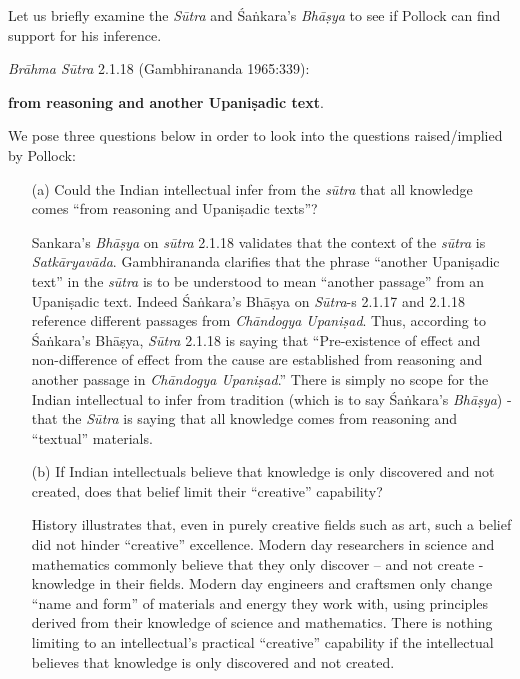 Let us briefly examine the {\sl Sūtra} and Śaṅkara's {\sl Bhāṣya} to see if Pollock can find support for his inference.

{\sl Brāhma Sūtra} 2.1.18 (Gambhirananda 1965:339):
\begin{myquote}
 \textbf{from reasoning and another Upaniṣadic text}.
\end{myquote}

We pose three questions below in order to look into the questions raised/implied by Pollock:
\begin{itemize}
\item[(a)] Could the Indian intellectual infer from the {\sl sūtra} that all knowledge comes ``from reasoning and Upaniṣadic texts''?

Sankara's {\sl Bhāṣya} on {\sl sūtra} 2.1.18 validates that the context of the {\sl sūtra} is {\sl Satkāryavāda}.  Gambhirananda clarifies that the phrase ``another Upaniṣadic text'' in the {\sl sūtra} is to be understood to mean ``another passage'' from an Upaniṣadic text. Indeed Śaṅkara's Bhāṣya on {\sl Sūtra}-s 2.1.17 and 2.1.18 reference different passages from {\sl Chāndogya Upaniṣad}. Thus, according to Śaṅkara's Bhāṣya, {\sl Sūtra} 2.1.18 is saying that ``Pre-existence of effect and non-difference of effect from the cause are established from reasoning and another passage in {\sl Chāndogya Upaniṣad}.''  There is simply no scope for the Indian intellectual to infer from tradition (which is to say Śaṅkara's {\sl Bhāṣya}) - that the {\sl Sūtra} is saying that all knowledge comes from reasoning and ``textual'' materials.

\item[(b)] If Indian intellectuals believe that knowledge is only discovered and not created, does that belief limit their ``creative'' capability?

History illustrates that, even in purely creative fields such as art, such a belief did not hinder ``creative'' excellence.  Modern day researchers in science and mathematics commonly believe that they only discover -- and not create - knowledge in their fields.  Modern day engineers and craftsmen only change ``name and form'' of materials and energy they work with, using principles derived from their knowledge of science and mathematics. There is nothing limiting to an intellectual's practical ``creative'' capability if the intellectual believes that knowledge is only discovered and not created.


\end{itemize}
